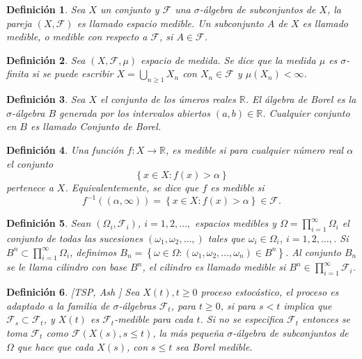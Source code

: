\documentclass{article}
\newtheorem{Def}{Definición}[section]
\newcommand{\rea}{\mathbb{R}}
\numberwithin{equation}{section}
\begin{document}
\begin{Def}
Sea $X$ un conjunto y $\mathcal{F}$ una $\sigma$-\'algebra de subconjuntos de $X$, la pareja $\left(X,\mathcal{F}\right)$ es llamado espacio medible. Un subconjunto $A$ de $X$ es llamado medible, o medible con respecto a $\mathcal{F}$, si $A\in\mathcal{F}$.
\end{Def}

\begin{Def}
Sea $\left(X,\mathcal{F},\mu\right)$ espacio de medida. Se dice que la medida $\mu$ es $\sigma$-finita si se puede escribir $X=\bigcup_{n\geq1}X_{n}$ con $X_{n}\in\mathcal{F}$ y $\mu\left(X_{n}\right)<\infty$.
\end{Def}

\begin{Def}\label{Cto.Borel}
Sea $X$ el conjunto de los \'umeros reales $\rea$. El \'algebra de Borel es la $\sigma$-\'algebra $B$ generada por los intervalos abiertos $\left(a,b\right)\in\rea$. Cualquier conjunto en $B$ es llamado {\em Conjunto de Borel}.
\end{Def}

\begin{Def}\label{Funcion.Medible}
Una funci\'on $f:X\rightarrow\rea$, es medible si para cualquier n\'umero real $\alpha$ el conjunto \[\left\{x\in X:f\left(x\right)>\alpha\right\}\] pertenece a $X$. Equivalentemente, se dice que $f$ es medible si \[f^{-1}\left(\left(\alpha,\infty\right)\right)=\left\{x\in X:f\left(x\right)>\alpha\right\}\in\mathcal{F}.\]
\end{Def}


\begin{Def}\label{Def.Cilindros}
Sean $\left(\Omega_{i},\mathcal{F}_{i}\right)$, $i=1,2,\ldots,$ espacios medibles y $\Omega=\prod_{i=1}^{\infty}\Omega_{i}$ el conjunto de todas las sucesiones $\left(\omega_{1},\omega_{2},\ldots,\right)$ tales que $\omega_{i}\in\Omega_{i}$, $i=1,2,\ldots,$. Si $B^{n}\subset\prod_{i=1}^{\infty}\Omega_{i}$, definimos $B_{n}=\left\{\omega\in\Omega:\left(\omega_{1},\omega_{2},\ldots,\omega_{n}\right)\in B^{n}\right\}$. Al conjunto $B_{n}$ se le llama {\em cilindro} con base $B^{n}$, el cilindro es llamado medible si $B^{n}\in\prod_{i=1}^{\infty}\mathcal{F}_{i}$.
\end{Def}


\begin{Def}\label{Def.Proc.Adaptado}[TSP, Ash \cite{RBA}]%
Sea $X\left(t\right),t\geq0$ proceso estoc\'astico, el proceso es adaptado a la familia de $\sigma$-\'algebras $\mathcal{F}_{t}$, para $t\geq0$, si para $s<t$ implica que $\mathcal{F}_{s}\subset\mathcal{F}_{t}$, y $X\left(t\right)$ es $\mathcal{F}_{t}$-medible para cada $t$. Si no se especifica $\mathcal{F}_{t}$ entonces se toma $\mathcal{F}_{t}$ como $\mathcal{F}\left(X\left(s\right),s\leq t\right)$, la m\'as peque\~na $\sigma$-\'algebra de subconjuntos de $\Omega$ que hace que cada $X\left(s\right)$, con $s\leq t$ sea Borel medible.
\end{Def}
\end{document}
